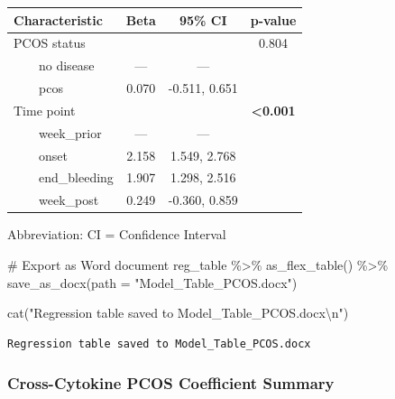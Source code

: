 \documentclass[
  letterpaper,
  DIV=11,
  numbers=noendperiod]{scrartcl}
\newenvironment{Shaded}{\begin{snugshade}}{\end{snugshade}}
\newcommand{\AttributeTok}[1]{\textcolor[rgb]{0.40,0.45,0.13}{#1}}
\newcommand{\CommentTok}[1]{\textcolor[rgb]{0.37,0.37,0.37}{#1}}
\newcommand{\FunctionTok}[1]{\textcolor[rgb]{0.28,0.35,0.67}{#1}}
\newcommand{\NormalTok}[1]{\textcolor[rgb]{0.00,0.23,0.31}{#1}}
\newcommand{\SpecialCharTok}[1]{\textcolor[rgb]{0.37,0.37,0.37}{#1}}
\newcommand{\StringTok}[1]{\textcolor[rgb]{0.13,0.47,0.30}{#1}}
\begin{document}
\begin{table}
\fontsize{12.0pt}{14.0pt}\selectfont
\begin{tabular*}{\linewidth}{@{\extracolsep{\fill}}lccc}
\toprule
\textbf{Characteristic} & \textbf{Beta} & \textbf{95\% CI} & \textbf{p-value} \\ 
\midrule\addlinespace[2.5pt]
PCOS status &  &  & 0.804 \\ 
    no disease & — & — &  \\ 
    pcos & 0.070 & -0.511, 0.651 &  \\ 
Time point &  &  & {\bfseries <0.001} \\ 
    week\_prior & — & — &  \\ 
    onset & 2.158 & 1.549, 2.768 &  \\ 
    end\_bleeding & 1.907 & 1.298, 2.516 &  \\ 
    week\_post & 0.249 & -0.360, 0.859 &  \\ 
\bottomrule
\end{tabular*}
\begin{minipage}{\linewidth}
\vspace{.05em}
Abbreviation: CI = Confidence Interval\\
\end{minipage}
\end{table}

\begin{Shaded}
\begin{Highlighting}[]
\CommentTok{\# Export as Word document}
\NormalTok{reg\_table }\SpecialCharTok{\%\textgreater{}\%}
  \FunctionTok{as\_flex\_table}\NormalTok{() }\SpecialCharTok{\%\textgreater{}\%}
  \FunctionTok{save\_as\_docx}\NormalTok{(}\AttributeTok{path =} \StringTok{"Model\_Table\_PCOS.docx"}\NormalTok{)}

\FunctionTok{cat}\NormalTok{(}\StringTok{"Regression table saved to Model\_Table\_PCOS.docx}\SpecialCharTok{\textbackslash{}n}\StringTok{"}\NormalTok{)}
\end{Highlighting}
\end{Shaded}

\begin{verbatim}
Regression table saved to Model_Table_PCOS.docx
\end{verbatim}

\subsubsection{Cross-Cytokine PCOS Coefficient
Summary}\label{cross-cytokine-pcos-coefficient-summary}
\end{document}
